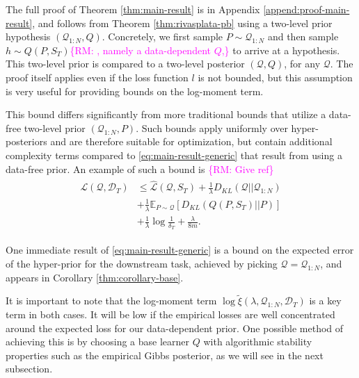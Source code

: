 \documentclass[letterpaper]{article} %
\theoremstyle{definition}
\newcommand{\Expect}[2]{\mathbb{E}_{#1}\left [#2 \right ]}
\newcommand{\RM}[1]{\textcolor{magenta}{\{RM: #1\}}}
\begin{document}
The full proof of Theorem \ref{thm:main-result} is in Appendix \ref{append:proof-main-result}, and follows from Theorem \ref{thm:rivasplata-pb} using a two-level prior hypothesis $(\mathcal{Q}_{1:N}, Q)$. Concretely, we first sample $P\sim \mathcal{Q}_{1:N}$ and then sample $h\sim Q(P, S_T)$\RM{, namely a data-dependent $Q$,} to arrive at a hypothesis. This two-level prior is compared to a two-level posterior $(\mathcal{Q}, Q)$, for any $\mathcal{Q}$. The proof itself applies even if the loss function $l$ is not bounded, but this assumption is very useful for providing bounds on the log-moment term.

This bound differs significantly from more traditional bounds that utilize a data-free two-level prior $(\mathcal{Q}_{1:N}, P)$. Such bounds apply uniformly over hyper-posteriors and are therefore suitable for optimization, but contain additional complexity terms compared to \eqref{eq:main-result-generic} that result from using a data-free prior. An example of such a bound is \RM{Give ref}
%
\begin{align} \label{eq:main-result-generic-datafree}
\begin{split}
\mathcal{L}(\mathcal{Q}, \mathcal{D}_T) &\leq \hat{\mathcal{L}}(\mathcal{Q}, S_T) 
+ \frac{1}{\lambda}D_{KL}(\mathcal{Q}||\mathcal{Q}_{1:N}) \\
&+ \frac{1}{\lambda}\Expect{P\sim \mathcal{Q}}{D_{KL}(Q(P,S_T)||P)}\\
&+\frac{1}{\lambda}\log\frac{1}{\delta_T}+\frac{\lambda}{8m} .
\end{split}
\end{align}


One immediate result of \eqref{eq:main-result-generic} is a bound on the expected error of the hyper-prior for the downstream task, achieved by picking $\mathcal{Q}=\mathcal{Q}_{1:N}$, and appears in Corollary \ref{thm:corollary-base}.

It is important to note that the log-moment term $\log\tilde{\xi}(\lambda,\mathcal{Q}_{1:N},\mathcal{D}_T)$ is a key term in both cases. It will be low if the empirical losses are well concentrated around the expected loss for our data-dependent prior. One possible method of achieving this is by choosing a base learner $Q$ with algorithmic stability properties such as the empirical Gibbs posterior, as we will see in the next subsection.
\end{document}
